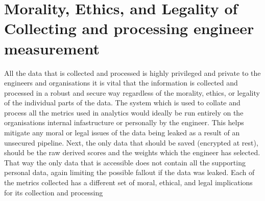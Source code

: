 \documentclass[11pt, a4paper]{article}
\begin{document}
    \section{Morality, Ethics, and Legality of Collecting and processing engineer measurement}
    All the data that is collected and processed is highly privileged and private to the engineers and organisations it is vital that the information is collected and processed in a robust and secure way regardless of the morality, ethics, or legality of the individual parts of the data. The system which is used to collate and process all the metrics used in analytics would ideally be run entirely on the organisations internal infastructure or personally by the engineer. This helps mitigate any moral or legal issues of the data being leaked as a result of an unsecured pipeline. Next, the only data that should be saved (encrypted at rest), should be the raw derived scores and the weights which the engineer has selected. That way the only data that is accessible does not contain all the supporting personal data, again limiting the possible fallout if the data was leaked. Each of the metrics collected has a different set of moral, ethical, and legal implications for its collection and processing
\end{document}

